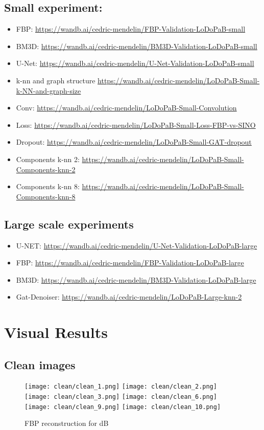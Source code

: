 \subsection{Small experiment:}
\begin{itemize}
  \item FBP: \url{https://wandb.ai/cedric-mendelin/FBP-Validation-LoDoPaB-small}
  \item BM3D: \url{https://wandb.ai/cedric-mendelin/BM3D-Validation-LoDoPaB-small}
  \item U-Net: \url{https://wandb.ai/cedric-mendelin/U-Net-Validation-LoDoPaB-small}
  \item k-nn and graph structure \url{https://wandb.ai/cedric-mendelin/LoDoPaB-Small-k-NN-and-graph-size}
  \item Conv: \url{https://wandb.ai/cedric-mendelin/LoDoPaB-Small-Convolution}
  \item Loss: \url{https://wandb.ai/cedric-mendelin/LoDoPaB-Small-Loss-FBP-vs-SINO}
  \item Dropout: \url{https://wandb.ai/cedric-mendelin/LoDoPaB-Small-GAT-dropout}
  \item Components k-nn 2: \url{https://wandb.ai/cedric-mendelin/LoDoPaB-Small-Components-knn-2}
  \item Components k-nn 8: \url{https://wandb.ai/cedric-mendelin/LoDoPaB-Small-Components-knn-8}
\end{itemize}

\subsection{Large scale experiments}
\begin{itemize}
  \item U-NET: \url{https://wandb.ai/cedric-mendelin/U-Net-Validation-LoDoPaB-large}
  \item FBP: \url{https://wandb.ai/cedric-mendelin/FBP-Validation-LoDoPaB-large}
  \item BM3D: \url{https://wandb.ai/cedric-mendelin/BM3D-Validation-LoDoPaB-large}
  \item Gat-Denoiser: \url{https://wandb.ai/cedric-mendelin/LoDoPaB-Large-knn-2}
\end{itemize}


\section{Visual Results}

\subsection{Clean images}
\begin{figure}[H]
  \centering
  \hfill
  \texttt{[image: clean/clean\_1.png]}
  \hfill
  \texttt{[image: clean/clean\_2.png]}
  \hfill
  \texttt{[image: clean/clean\_3.png]}
  \hfill
  \texttt{[image: clean/clean\_6.png]}
  \hfill
  \texttt{[image: clean/clean\_9.png]}
  \hfill
  \texttt{[image: clean/clean\_10.png]}
  \hfill
  \caption{FBP reconstruction for  dB}
\end{figure}


